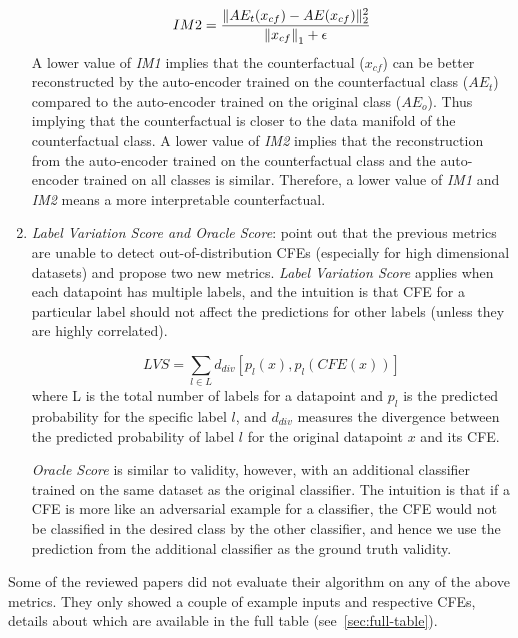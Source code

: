 \begin{enumerate}[leftmargin=*]
    \begin{equation}
        IM2 = \frac{\|AE_t(x_{cf}) - AE(x_{cf})\|_2^2}{\left\|x_{cf}\right\|_1 + \epsilon}
    \end{equation}
    A lower value of \emph{IM1} implies that the counterfactual ($x_{cf}$) can be better reconstructed by the auto-encoder trained on the counterfactual class ($AE_t$) compared to the auto-encoder trained on the original class ($AE_o$). Thus implying that the counterfactual is closer to the data manifold of the counterfactual class.  
    A lower value of \emph{IM2} implies that the reconstruction from the auto-encoder trained on the counterfactual class and the auto-encoder trained on all classes is similar. 
    Therefore, a lower value of \emph{IM1} and \emph{IM2} means a more interpretable counterfactual. 
    
    \item \emph{Label Variation Score and Oracle Score}: \citet{hvilshoj-cfe-new-metrics} point out that the previous metrics are unable to detect out-of-distribution CFEs (especially for high dimensional datasets) and propose two new metrics. \emph{Label Variation Score} applies when each datapoint has multiple labels, and the intuition is that CFE for a particular label should not affect the predictions for other labels (unless they are highly correlated). 
    
    \begin{equation}
        LVS = \sum_{l \in L} d_{div} [ p_{l}(x), p_{l}(CFE(x)) ]
    \end{equation}
    where L is the total number of labels for a datapoint and $p_{l}$ is the predicted probability for the specific label $l$, and $d_{div}$ measures the divergence between the predicted probability of label $l$ for the original datapoint $x$ and its CFE. 
    
    \emph{Oracle Score} is similar to validity, however, with an additional classifier trained on the same dataset as the original classifier. The intuition is that if a CFE is more like an adversarial example for a classifier, the CFE would not be classified in the desired class by the other classifier, and hence we use the prediction from the additional classifier as the ground truth validity. 
    
\end{enumerate}

Some of the reviewed papers did not evaluate their algorithm on any of the above metrics. They only showed a couple of example inputs and respective CFEs, details about which are available in the full table (see~\cref{sec:full-table}).  

